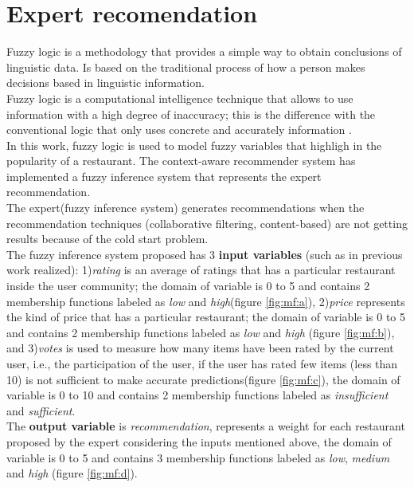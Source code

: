 \section{Expert recomendation} 

Fuzzy logic is a methodology that provides a simple way to obtain
conclusions of linguistic data. Is based on the traditional process of
how a person makes decisions based in linguistic information. \\    Fuzzy
logic is a computational intelligence technique that allows to use
information with a high degree of inaccuracy; this is the difference
with the conventional logic that only uses concrete and accurately
information \cite{zedeh1989knowledge}.\\  In this work, fuzzy logic is
used to model fuzzy variables that highligh in the popularity of a
restaurant. The context-aware recommender system has implemented a
fuzzy inference system that represents the expert recommendation. \\   
The expert(fuzzy inference system) generates recommendations when the
recommendation techniques (collaborative filtering, content-based) are
not getting results because of the cold start problem.\\   The fuzzy
inference system proposed has 3 \textbf{input variables} (such as in
previous work realized\cite{garcia2009hybrid}): 1)\textit{rating} is
an average of ratings that has a particular restaurant inside the user
community; the domain of variable is 0 to 5 and contains 2 membership
functions labeled as \textit{low} and \textit{high}(figure
\ref{fig:mf:a}), 2)\textit{price} represents the kind of price that
has a particular restaurant; the domain of variable is 0 to 5 and
contains 2 membership functions labeled as \textit{low} and
\textit{high} (figure \ref{fig:mf:b}), and 3)\textit{votes} is used to
measure how many items have been rated by the current user, i.e., the
participation of the user, if the user has rated few items (less than
10) is not sufficient to make accurate predictions(figure
\ref{fig:mf:c}), the domain of variable is 0 to 10 and contains 2
membership functions labeled as \textit{insufficient} and
\textit{sufficient}. \\ The \textbf{output variable} is
\textit{recommendation}, represents a weight for each restaurant
proposed by the expert considering the inputs mentioned above, the
domain of variable is 0 to 5 and contains 3 membership functions
labeled as \textit{low}, \textit{medium} and \textit{high} (figure
\ref{fig:mf:d}).

